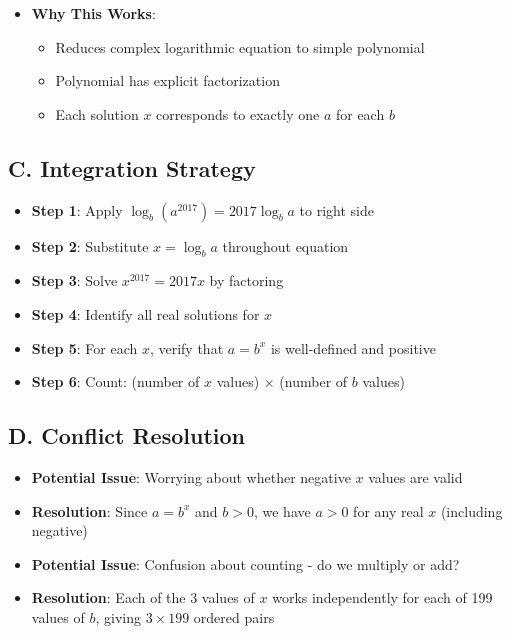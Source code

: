 \documentclass[]{article}
\begin{document}
\begin{techniquesbox}
\begin{itemize}[leftmargin=*]
    \item \textbf{Why This Works}: 
    \begin{itemize}
        \item Reduces complex logarithmic equation to simple polynomial
        \item Polynomial has explicit factorization
        \item Each solution $x$ corresponds to exactly one $a$ for each $b$
    \end{itemize}
\end{itemize}

\subsection*{C. Integration Strategy}
\begin{itemize}[leftmargin=*]
    \item \textbf{Step 1}: Apply $\log_b(a^{2017}) = 2017\log_b a$ to right side
    
    \item \textbf{Step 2}: Substitute $x = \log_b a$ throughout equation
    
    \item \textbf{Step 3}: Solve $x^{2017} = 2017x$ by factoring
    
    \item \textbf{Step 4}: Identify all real solutions for $x$
    
    \item \textbf{Step 5}: For each $x$, verify that $a = b^x$ is well-defined and positive
    
    \item \textbf{Step 6}: Count: (number of $x$ values) $\times$ (number of $b$ values)
\end{itemize}

\subsection*{D. Conflict Resolution}
\begin{itemize}[leftmargin=*]
    \item \textbf{Potential Issue}: Worrying about whether negative $x$ values are valid
    
    \item \textbf{Resolution}: Since $a = b^x$ and $b > 0$, we have $a > 0$ for any real $x$ (including negative)
    
    \item \textbf{Potential Issue}: Confusion about counting - do we multiply or add?
    
    \item \textbf{Resolution}: Each of the 3 values of $x$ works independently for each of 199 values of $b$, giving $3 \times 199$ ordered pairs
\end{itemize}
\end{techniquesbox}
\end{document}
